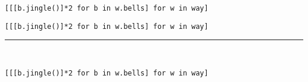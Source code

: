 \documentclass[12pt,a4paper]{article}
\begin{document}
\begin{lstlisting}
[[[b.jingle()]*2 for b in w.bells] for w in way]
\end{lstlisting}

\begin{lstlisting}
[[[b.jingle()]*2 for b in w.bells] for w in way]
\end{lstlisting}

\rule{\linewidth}{1pt}\\

\begin{lstlisting}
[[[b.jingle()]*2 for b in w.bells] for w in way]
\end{lstlisting}
\end{document}
